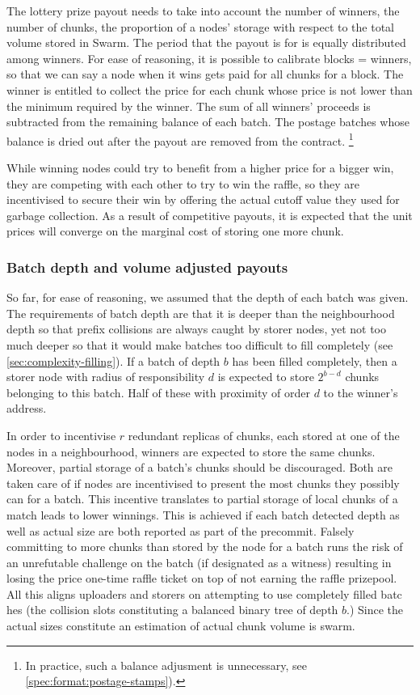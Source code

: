 The lottery prize payout needs to take into account the number of winners, the number of chunks, the proportion of a nodes' storage with respect to the total volume stored in Swarm.
The period that the payout is for is equally distributed among winners. For ease of reasoning, it is possible to calibrate blocks = winners, so that we can say a node when it wins gets paid for all chunks for a block. The winner is entitled to collect the price for each chunk whose price is not lower than the minimum required by the winner. The sum of all winners' proceeds is subtracted from the remaining balance of each batch. The postage batches whose balance is dried out after the payout are removed from the contract.%
%
\footnote{In practice, such a balance adjusment is unnecessary, see \ref{spec:format:postage-stamps}).
}

While winning nodes could try to benefit from a higher price for a bigger win, they are competing with each other to try to win the raffle, so they are incentivised to secure their win by offering the actual cutoff value they used for garbage collection. As a result of competitive payouts, it is expected that the unit prices will converge on the marginal cost of storing one more chunk.




\subsubsection{Batch depth and volume adjusted payouts}

So far, for ease of reasoning, we assumed that the depth of each batch was given.  The requirements of batch depth are that it is deeper than the neighbourhood depth so that prefix collisions are always caught by storer nodes, yet not too much deeper so that it would make batches too difficult to fill completely (see \ref{sec:complexity-filling}). If a batch of depth $b$ has been filled completely, then a storer node with radius of responsibility $d$ is expected to store  $2^{b-d}$ chunks belonging to this batch.
Half of these with proximity of order $d$ to the winner's address. 

In order to incentivise $r$ redundant replicas of chunks, each stored at one of  the  nodes in a neighbourhood, winners are expected to store the same chunks. 
Moreover, partial storage of a batch's chunks should be discouraged. 
Both are  taken care of if nodes are incentivised to present the most chunks they possibly can for a batch.
This incentive translates to partial  storage of local chunks of a match leads to lower winnings. This is achieved if each batch detected depth as well as actual size are both reported as part of the precommit. Falsely committing to more chunks than stored by the node for a batch runs the risk of an unrefutable challenge on the batch (if designated as a witness) resulting in losing the price one-time raffle ticket on top of not earning  the raffle prizepool. All this aligns uploaders   and storers on attempting to use completely filled batc hes (the collision slots constituting a balanced binary tree of depth $b$.)
Since the actual sizes constitute an estimation of actual chunk volume is swarm. 

